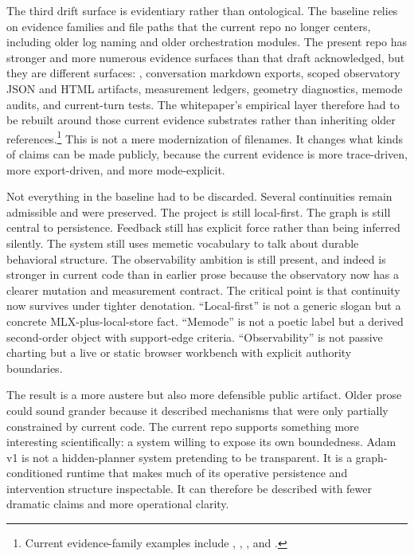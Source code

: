 \documentclass[10pt]{article}
\begin{document}
The third drift surface is evidentiary rather than ontological. The baseline relies on evidence families and file paths that the current repo no longer centers, including older log naming and older orchestration modules. The present repo has stronger and more numerous evidence surfaces than that draft acknowledged, but they are different surfaces: , conversation markdown exports, scoped observatory JSON and HTML artifacts, measurement ledgers, geometry diagnostics, memode audits, and current-turn tests. The whitepaper's empirical layer therefore had to be rebuilt around those current evidence substrates rather than inheriting older references.\footnote{Current evidence-family examples include , , , and .} This is not a mere modernization of filenames. It changes what kinds of claims can be made publicly, because the current evidence is more trace-driven, more export-driven, and more mode-explicit.

Not everything in the baseline had to be discarded. Several continuities remain admissible and were preserved. The project is still local-first. The graph is still central to persistence. Feedback still has explicit force rather than being inferred silently. The system still uses memetic vocabulary to talk about durable behavioral structure. The observability ambition is still present, and indeed is stronger in current code than in earlier prose because the observatory now has a clearer mutation and measurement contract. The critical point is that continuity now survives under tighter denotation. ``Local-first'' is not a generic slogan but a concrete MLX-plus-local-store fact. ``Memode'' is not a poetic label but a derived second-order object with support-edge criteria. ``Observability'' is not passive charting but a live or static browser workbench with explicit authority boundaries.

The result is a more austere but also more defensible public artifact. Older prose could sound grander because it described mechanisms that were only partially constrained by current code. The current repo supports something more interesting scientifically: a system willing to expose its own boundedness. Adam v1 is not a hidden-planner system pretending to be transparent. It is a graph-conditioned runtime that makes much of its operative persistence and intervention structure inspectable. It can therefore be described with fewer dramatic claims and more operational clarity.
\end{document}
